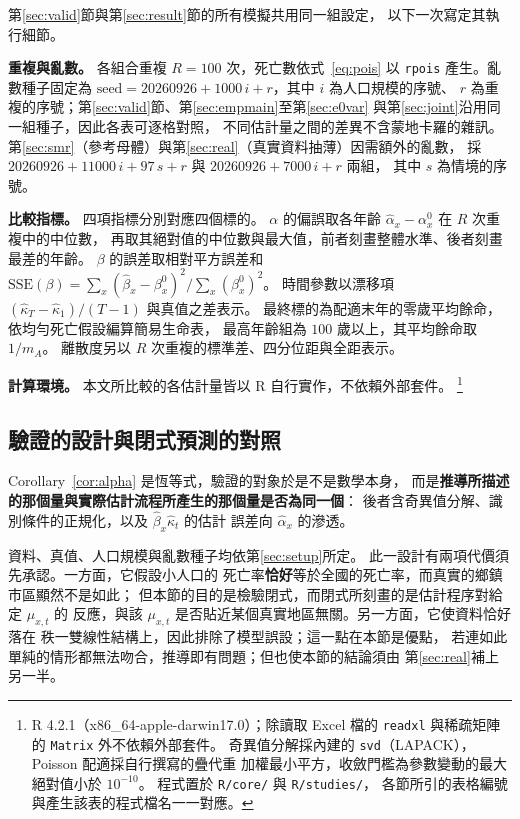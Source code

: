 \documentclass[UTF8, fontset=macnew, a4paper, 12pt]{ctexart}
\begin{document}
第\ref{sec:valid}節與第\ref{sec:result}節的所有模擬共用同一組設定，
以下一次寫定其執行細節。

\textbf{重複與亂數。} 各組合重複 $R=100$ 次，死亡數依式~\eqref{eq:pois}
以 \texttt{rpois} 產生。亂數種子固定為
$\text{seed}=20260926+1000\,i+r$，其中 $i$ 為人口規模的序號、
$r$ 為重複的序號；第\ref{sec:valid}節、第\ref{sec:empmain}至第\ref{sec:e0var}
與第\ref{sec:joint}沿用同一組種子，因此各表可逐格對照，
不同估計量之間的差異不含蒙地卡羅的雜訊。
第\ref{sec:smr}（參考母體）與第\ref{sec:real}（真實資料抽薄）因需額外的亂數，
採 $20260926+11000\,i+97\,s+r$ 與 $20260926+7000\,i+r$ 兩組，
其中 $s$ 為情境的序號。

\textbf{比較指標。} 四項指標分別對應四個標的。
$\alpha$ 的偏誤取各年齡 $\hat\alpha_x-\alpha^{0}_x$ 在 $R$ 次重複中的中位數，
再取其絕對值的中位數與最大值，前者刻畫整體水準、後者刻畫最差的年齡。
$\beta$ 的誤差取相對平方誤差和
$\mathrm{SSE}(\beta)=\sum_x(\hat\beta_x-\beta^{0}_x)^2\big/\sum_x(\beta^{0}_x)^2$。
時間參數以漂移項 $(\hat\kappa_T-\hat\kappa_1)/(T-1)$ 與真值之差表示。
最終標的為配適末年的零歲平均餘命，依均勻死亡假設編算簡易生命表，
最高年齡組為 $100$ 歲以上，其平均餘命取 $1/m_{A}$。
離散度另以 $R$ 次重複的標準差、四分位距與全距表示。

\textbf{計算環境。} 本文所比較的各估計量皆以 R 自行實作，不依賴外部套件。%
\footnote{R 4.2.1（x86\_64-apple-darwin17.0）；除讀取 Excel 檔的
\texttt{readxl} 與稀疏矩陣的 \texttt{Matrix} 外不依賴外部套件。
奇異值分解採內建的 \texttt{svd}（LAPACK），Poisson 配適採自行撰寫的疊代重
加權最小平方，收斂門檻為參數變動的最大絕對值小於 $10^{-10}$。
程式置於 \texttt{R/core/} 與 \texttt{R/studies/}，
各節所引的表格編號與產生該表的程式檔名一一對應。}


\subsection{驗證的設計與閉式預測的對照}\label{subsec:vdesign}\label{sec:closedfit}

Corollary~\ref{cor:alpha} 是恆等式，驗證的對象於是不是數學本身，
而是\textbf{推導所描述的那個量與實際估計流程所產生的那個量是否為同一個}：
後者含奇異值分解、識別條件的正規化，以及 $\hat\beta_x\hat\kappa_t$ 的估計
誤差向 $\hat\alpha_x$ 的滲透。

資料、真值、人口規模與亂數種子均依第\ref{sec:setup}所定。
此一設計有兩項代價須先承認。一方面，它假設小人口的
死亡率\textbf{恰好}等於全國的死亡率，而真實的鄉鎮市區顯然不是如此；
但本節的目的是檢驗閉式，而閉式所刻畫的是估計程序對給定 $\mu_{x,t}$ 的
反應，與該 $\mu_{x,t}$ 是否貼近某個真實地區無關。另一方面，它使資料恰好落在
秩一雙線性結構上，因此排除了模型誤設；這一點在本節是優點，
若連如此單純的情形都無法吻合，推導即有問題；但也使本節的結論須由
第\ref{sec:real}補上另一半。
\end{document}
